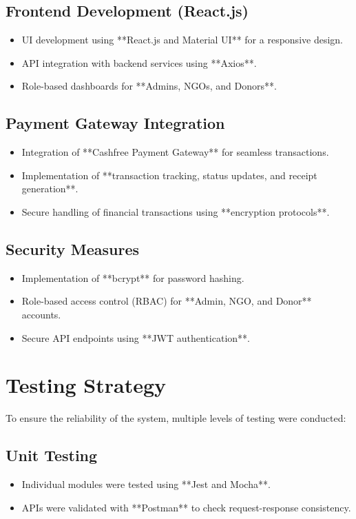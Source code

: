 \subsection{Frontend Development (React.js)}
\begin{itemize}
    \item UI development using **React.js and Material UI** for a responsive design.
    \item API integration with backend services using **Axios**.
    \item Role-based dashboards for **Admins, NGOs, and Donors**.
\end{itemize}

\subsection{Payment Gateway Integration}
\begin{itemize}
    \item Integration of **Cashfree Payment Gateway** for seamless transactions.
    \item Implementation of **transaction tracking, status updates, and receipt generation**.
    \item Secure handling of financial transactions using **encryption protocols**.
\end{itemize}

\subsection{Security Measures}
\begin{itemize}
    \item Implementation of **bcrypt** for password hashing.
    \item Role-based access control (RBAC) for **Admin, NGO, and Donor** accounts.
    \item Secure API endpoints using **JWT authentication**.
\end{itemize}

\section{Testing Strategy}
To ensure the reliability of the system, multiple levels of testing were conducted:

\subsection{Unit Testing}
\begin{itemize}
    \item Individual modules were tested using **Jest and Mocha**.
    \item APIs were validated with **Postman** to check request-response consistency.
\end{itemize}

